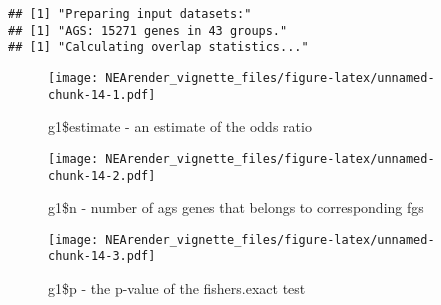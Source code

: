 \documentclass[]{article}
\newenvironment{Shaded}{\begin{snugshade}}{\end{snugshade}}
\newcommand{\KeywordTok}[1]{\textcolor[rgb]{0.13,0.29,0.53}{\textbf{#1}}}
\newcommand{\DataTypeTok}[1]{\textcolor[rgb]{0.13,0.29,0.53}{#1}}
\newcommand{\DecValTok}[1]{\textcolor[rgb]{0.00,0.00,0.81}{#1}}
\newcommand{\OperatorTok}[1]{\textcolor[rgb]{0.81,0.36,0.00}{\textbf{#1}}}
\newcommand{\NormalTok}[1]{#1}
\begin{document}
\begin{verbatim}
## [1] "Preparing input datasets:"
## [1] "AGS: 15271 genes in 43 groups."
## [1] "Calculating overlap statistics..."
\end{verbatim}

\begin{Shaded}
\end{Shaded}

\begin{figure}
\centering
\texttt{[image: NEArender\_vignette\_files/figure-latex/unnamed-chunk-14-1.pdf]}
\caption{g1\$estimate - an estimate of the odds ratio}
\end{figure}

\begin{Shaded}
\end{Shaded}

\begin{figure}
\centering
\texttt{[image: NEArender\_vignette\_files/figure-latex/unnamed-chunk-14-2.pdf]}
\caption{g1\$n - number of ags genes that belongs to corresponding fgs}
\end{figure}

\begin{Shaded}
\end{Shaded}

\begin{figure}
\centering
\texttt{[image: NEArender\_vignette\_files/figure-latex/unnamed-chunk-14-3.pdf]}
\caption{g1\$p - the p-value of the fishers.exact test}
\end{figure}

\begin{Shaded}
\end{Shaded}
\end{document}

